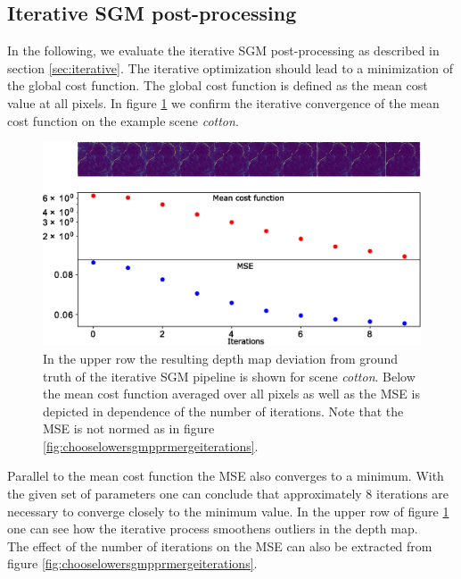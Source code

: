 \documentclass  [
  paper    = a4,
  BCOR     = 10mm,
  twoside,
  fontsize = 12pt,
  fleqn,
  toc      = bibnumbered,
  toc      = listofnumbered,
  numbers  = noendperiod,
  headings = normal,
  listof   = leveldown,
  version  = 3.03
]                                       {scrreprt}
\begin{document}
\subsection{Iterative SGM post-processing}
In the following, we evaluate the iterative SGM post-processing as described in section \ref{sec:iterative}. The iterative optimization should lead to a minimization of the global cost function. The global cost function is defined as the mean cost value at all pixels. In figure \ref{fig:iterationcostcotton} we confirm the iterative convergence of the mean cost function on the example scene \textit{cotton}.
\begin{figure}[h!]
	\centering
	\includegraphics[width=1\linewidth]{images/iteration_cost_cotton}
	\caption[Iterative improvement of scene \textit{cotton}]{In the upper row the resulting depth map deviation from ground truth of the iterative SGM pipeline is shown for scene \textit{cotton}. Below the mean cost function averaged over all pixels as well as the MSE is depicted in dependence of the number of iterations. Note that the MSE is not normed as in figure \ref{fig:chooselowersgmpprmergeiterations}.}
	\label{fig:iterationcostcotton}
\end{figure}
Parallel to the mean cost function the MSE also converges to a minimum. With the given set of parameters one can conclude that approximately 8 iterations are necessary to converge closely to the minimum value. In the upper row of figure \ref{fig:iterationcostcotton} one can see how the iterative process smoothens outliers in the depth map.\\
The effect of the number of iterations on the MSE can also be extracted from figure \ref{fig:chooselowersgmpprmergeiterations}. 
\end{document}
